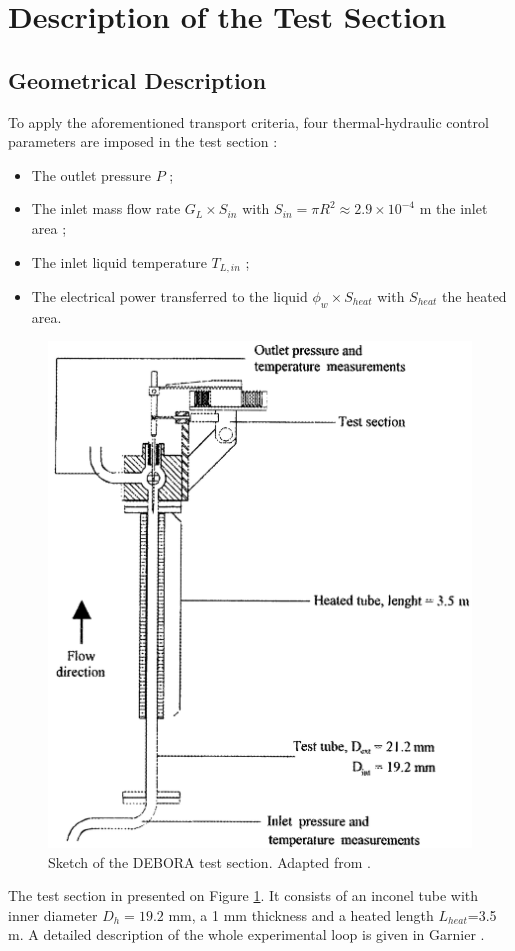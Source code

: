 \section{Description of the Test Section}

\subsection{Geometrical Description}
To apply the aforementioned transport criteria, four thermal-hydraulic control parameters are imposed in the test section :

\begin{itemize}
\item The outlet pressure $P$ ;
\item The inlet mass flow rate $G_{L}\times S_{in}$ with $S_{in} = \pi R^{2} \approx 2.9 \times 10^{-4}$ m the inlet area ;
\item The inlet liquid temperature $T_{L,in}$ ;
\item The electrical power transferred to the liquid $\phi_{w}\times S_{heat}$ with $S_{heat}$ the heated area. 
\end{itemize}

\begin{figure}[!h]
\centering
\includegraphics[width=0.5\linewidth]{img/DEBORA/debora_sketch.png}
\caption{Sketch of the DEBORA test section. Adapted from \cite{garnier_local_2001}.}
\label{fig:sketch_debora}
\end{figure}


The test section in presented on Figure \ref{fig:sketch_debora}. It consists of an inconel tube with inner diameter $D_{h}=19.2$ mm, a 1 mm thickness and a heated length $L_{heat}$=3.5 m. A detailed description of the whole experimental loop is given in Garnier \etal \cite{garnier_local_2001}.

